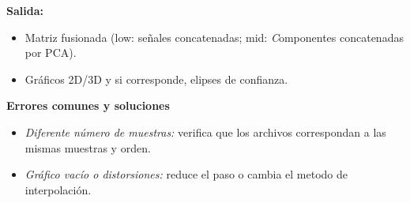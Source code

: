 \documentclass[12pt]{article}
\begin{document}
    \textbf{Salida:}
    \begin{itemize}
      \item Matriz fusionada (low: señales concatenadas; mid: \textit Componentes concatenadas por PCA).
      \item Gráficos 2D/3D y si corresponde, elipses de confianza.
    \end{itemize}
    
    \textbf{Errores comunes y soluciones}
    \begin{itemize}
      \item \textit{Diferente número de muestras:} verifica que los archivos correspondan a las mismas muestras y orden.
      \item \textit{Gráfico vacío o distorsiones:} reduce el paso o cambia el metodo de interpolación.
    \end{itemize}
    
\end{document}
